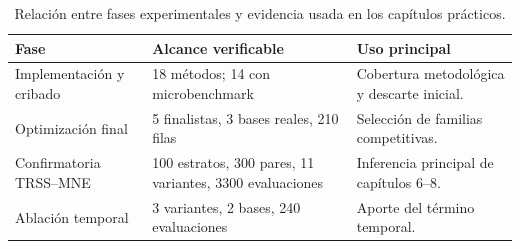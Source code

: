 \begin{table}[htbp]
\centering
\small
\caption{Relación entre fases experimentales y evidencia usada en los capítulos prácticos.}
\label{tab:ch6_phase_map}
\begin{tabular}{@{}p{2.8cm}p{4.2cm}p{4.4cm}@{}}
\toprule
Fase & Alcance verificable & Uso principal \\
\midrule
Implementación y cribado & 18 métodos; 14 con microbenchmark & Cobertura metodológica y descarte inicial. \\
Optimización final & 5 finalistas, 3 bases reales, 210 filas & Selección de familias competitivas. \\
Confirmatoria TRSS--MNE & 100 estratos, 300 pares, 11 variantes, 3300 evaluaciones & Inferencia principal de capítulos 6--8. \\
Ablación temporal & 3 variantes, 2 bases, 240 evaluaciones & Aporte del término temporal. \\
\bottomrule
\end{tabular}
\end{table}
